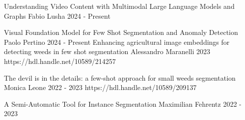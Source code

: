 


\begin{cvhonors}
  \msctesi
    {Understanding Video Content with Multimodal Large Language Models and Graphs}
    {Fabio Lusha} %
    {} %
    {2024 - Present} %
    {}

  \msctesi
    {Visual Foundation Model for Few Shot Segmentation and Anomaly Detection}
    {Paolo Pertino} %
    {} %
    {2024 - Present} %
    {}
  \msctesi
    {Enhancing agricultural image embeddings for detecting weeds in few shot segmentation}
    {Alessandro Maranelli} %
    {} %
    {2023} %
    {https://hdl.handle.net/10589/214257}

  \msctesi
    {The devil is in the details: a few-shot approach for small weeds segmentation}
    {Monica Leone} %
    {} %
    {2022 - 2023} %
    {https://hdl.handle.net/10589/209137} %

  \msctesi
    {A Semi-Automatic Tool for Instance Segmentation}
    {Maximilian Fehrentz} %
    {}%
    {2022 - 2023} 
    {}
\end{cvhonors}
